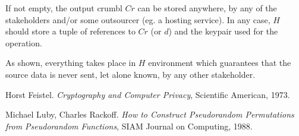 \documentclass[twoside,twocolumn]{article}
\theoremstyle{definition}
\theoremstyle{remark}
\begin{document}
If not empty, the output crumbl $Cr$ can be stored anywhere, by any of the stakeholders and/or some outsourcer (eg. a hosting service). In any case, 
$H$ should store a tuple of references to $Cr$ (or $d$) and the keypair used for the operation. 

As shown, everything takes place in $H$ environment which guarantees that the source data is never sent, let alone known, by any other stakeholder.

\tableofcontents %


\begin{thebibliography}{99} %

Horst Feistel. \emph{Cryptography and Computer Privacy}, Scientific American, 1973.

Michael Luby, Charles Rackoff. \emph{How to Construct Pseudorandom Permutations from Pseudorandom Functions}, SIAM Journal on Computing, 1988.

\end{thebibliography}

\end{document}
